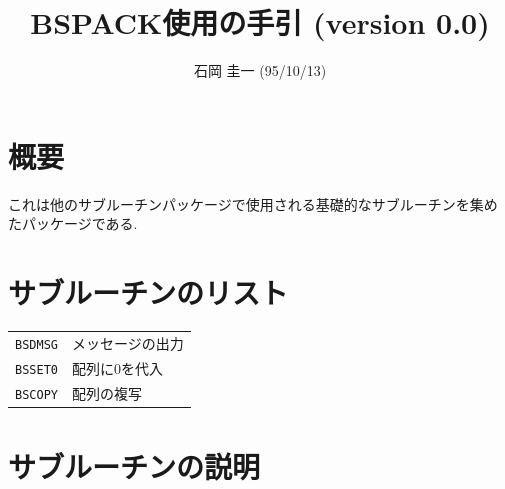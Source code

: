 %
%

\title{BSPACK使用の手引 (version 0.0)}
\author{石岡 圭一  (95/10/13)}
\date{}



\maketitle

\section{概要}

これは他のサブルーチンパッケージで使用される基礎的なサブルーチンを集め
たパッケージである.


\section{サブルーチンのリスト}

\vspace{1em}
\begin{tabular}{ll}
{\tt BSDMSG} & メッセージの出力\\
{\tt BSSET0} & 配列に0を代入\\
{\tt BSCOPY} & 配列の複写
\end{tabular}


\section{サブルーチンの説明}

